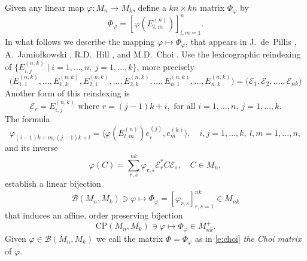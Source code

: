 \documentclass[12pt]{amsart}
\theoremstyle{definition}
\let\phi=\varphi
\begin{document}
Given any linear map $\phi\colon M_n{\rightarrow} M_k$, define a $kn\times kn$ matrix 
$\Phi_\phi$ by
\begin{equation}\label{e:choi} \Phi_\phi =[\phi(E_{l,m}^{(n)})]_{l,m=1}^n.
\end{equation}
In what follows we describe the mapping
$\phi\mapsto \Phi_\phi$, that appears  in J.~de~Pillis \cite{Pillis}, 
A.~Jamio\l kowski \cite{Jamiolkowski}, R.D.~Hill \cite{Hill}, and M.D.~Choi 
\cite{Choi}.
Use the lexicographic reindexing of 
$\{E_{i,j}^{(n,k)}\mid i=1,\ldots,n,\ 
j=1,\ldots,k\}$, more precisely
\begin{equation}\label{e:Es} 
\bigl(
E^{(n,k)}_{1,1},\ldots,E^{(n,k)}_{1,k},E^{(n,k)}_{2,1},\ldots,E^{(n,k)}_{2,k},
\ldots, E^{(n,k)}_{n,1},\ldots,E^{(n,k)}_{n,k}\bigr) 
=\bigl(\mathcal{E}_1,\mathcal{E}_2,....,\mathcal{E}_{nk} \bigr)
\end{equation}
Another form of this reindexing is 
\begin{equation}\label{reindexing} {{\mathcal E}}_r=E_{i,j}^{(n,k)}\mbox{ where }
r=(j-1)k+i,\mbox{ for all }i=1,\ldots,n,\ j=1,\ldots,k.
\end{equation}
The formula
\begin{equation}\label{e:prima} \phi_{(i-1)k+m,(j-1)k+l}
=\langle \phi(E_{l,m}^{(n)})e_{i}^{(j)},e_m^{(k)}\rangle,\quad i,j=1,\ldots,k,\
l,m=1,\ldots,n,
\end{equation} and its inverse
\begin{equation}\label{e:adoua} 
\phi(C)=\sum_{r,s}^{nk} \phi_{r,s} {{\mathcal E}}_r^*C{{\mathcal E}}_s,\quad C\in 
M_{n},
\end{equation} establish a linear  bijection 
\begin{equation}\label{e:defin}
{{\mathcal B}}(M_n,M_k)\ni\phi\mapsto \Phi_\phi=[\phi_{r,s}]_{r,s=1}^{nk}\in M_{nk}
\end{equation}  
 that induces an affine, order preserving bijection
\begin{equation}\label{e:cpmp}
\mathrm{CP}(M_n,M_k)\ni\phi\mapsto\Phi_\phi\in M_{nk}^+.
\end{equation}
Given $\phi\in{{\mathcal B}}(M_n,M_k)$ we call the matrix $\Phi =\Phi_\phi$ as in \eqref{e:choi} 
\emph{the Choi matrix} of $\phi$.
\end{document}

